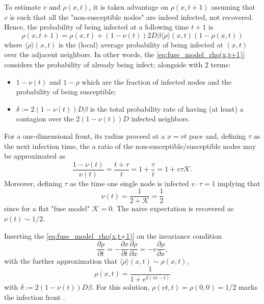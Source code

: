 \documentclass[a4paper,10pt,twoside]{book} %
\theoremstyle{definition}
\begin{document}
To estimate $v \text{ and } \rho(x,t)$, it is taken advantage on $\rho(x,t+1)$ assuming that $v$ is such that all the "non-susceptible nodes" are indeed infected, not recovered. Hence, the probability of being infected at a following time $t+1$ is
\begin{equation}
	\rho(x, t+1) = \rho(x,t)+(1-\nu(t))2D \beta \langle \rho \rangle(x,t) (1-\rho(x,t))
	\label{eq:fuse_model_rho(x,t+1)}
\end{equation}  
where $\langle \rho \rangle(x,t)$ is the (local) average probability of being infected at $(x,t)$ over the adjacent neighbors.
In other words, the \autoref{eq:fuse_model_rho(x,t+1)} considers the probability of already being infect; alongside with 2 terms:
\begin{itemize}
	\item $1-\nu(t)$ and $1-\rho$ which are the fraction of infected nodes and the probability of being susceptible;
	\item $\delta:= 2(1-\nu(t))D \beta$ is the total probability rate of having (at least) a contagion over the $2(1-\nu(t))D$ infected neighbors.
\end{itemize}
For a one-dimensional front, its radius proceed at a $x=vt$ pace and, defining $\tau$ as the next infection time, the a ratio of the non-susceptible/susceptible nodes may be approximated as 
\begin{equation*}
	\frac{1-\nu(t)}{\nu(t)} = \frac{t+\tau}{t} = 1+\frac{\tau}{t} = 1+v \tau \mathcal{K}.
\end{equation*}
Moreover, defining $\tau$ as the time one single node is infected $v \cdot \tau = 1$ implying that 
\[ \nu(t) = \frac{1}{2+\mathcal{K}} = \frac{1}{2} \]
since for a flat "fuse model" $\mathcal{K} = 0$. 
The naive expectation is recovered as $\nu(t) \sim 1/2$. 

Inserting the \autoref{eq:fuse_model_rho(x,t+1)} on the invariance condition 
\begin{equation}
	\frac{\partial \rho}{\partial t} = - \frac{\partial x}{\partial t} \frac{\partial \rho}{\partial x} = -v \frac{\partial \rho}{\partial x},
\end{equation}
with the further approximation that $\langle \rho \rangle(x,t) \sim \rho(x,t)$,
\begin{equation}
	\rho(x,t) = \frac{1}{1+e^{\delta(\tau x - t)}}
\end{equation}
with $\delta:= 2(1-\nu(t))D \beta$. 
For this solution, $\rho(vt,t) = \rho(0,0) = 1/2$ marks the infection front \cite{Thurner::Appendix_NetBasedExpl}. 
\end{document}
